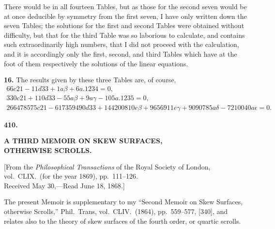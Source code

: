 \documentclass[11pt,a4paper]{article}
\begin{document}
There would be in all fourteen Tables, but as those for the second seven would be at once deducible by symmetry from the first seven, I have only written down the seven Tables; the solutions for the first and second Tables were obtained without difficulty, but that for the third Table was so laborious to calculate, and contains such extraordinarily high numbers, that I did not proceed with the calculation, and it is accordingly only the first, second, and third Tables which have at the foot of them respectively the solutions of the linear equations.

\textbf{16.} The results given by these three Tables are, of course,
\begin{gather*}
66c21 - 11d33 + 1a\beta + 6a.1234 = 0, \\
330c21 + 110d33 - 55a\beta + 9a\gamma - 105a.1235 = 0, \\
266478575c21 - 617359490d33 + 144200810e\beta + 9656911e\gamma + 9090785a\delta - 7210040a\epsilon = 0.
\end{gather*}

\newpage

\begin{center}
{\large\textbf{410.}}
\end{center}

\begin{center}
{\Large\textbf{A THIRD MEMOIR ON SKEW SURFACES,}}\\[4pt]
{\Large\textbf{OTHERWISE SCROLLS.}}
\end{center}

\begin{center}
[From the \textit{Philosophical Transactions} of the Royal Society of London,\\
vol.\ CLIX.\ (for the year 1869), pp.~111--126.\\
Received May 30,---Read June 18, 1868.]
\end{center}

The present Memoir is supplementary to my ``Second Memoir on Skew Surfaces, otherwise Scrolls,'' Phil.\ Trans, vol.\ CLIV.\ (1864), pp.~559--577, [340], and relates also to the theory of skew surfaces of the fourth order, or quartic scrolls.
\end{document}
